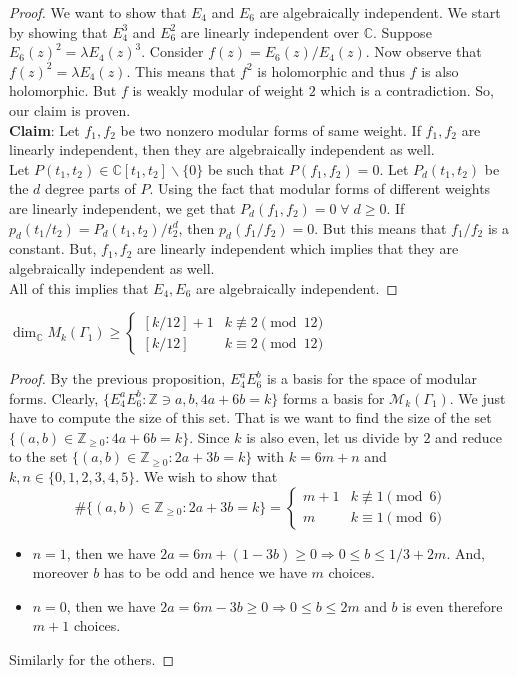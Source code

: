 \documentclass[oneside, 12pt]{scrbook}
\newcommand{\CC}{\mathbb C}
\newcommand{\ZZ}{\mathbb Z}
\newcommand{\Mm}{\mathcal{M}}
\theoremstyle{theorem}
\begin{document}
\begin{proof}
We want to show that $E_{4}$ and $E_{6}$ are algebraically independent. We start by showing that $E_{4}^3$ and $E_{6}^2$ are linearly independent over $\CC$. Suppose $E_{6}(z)^2 = \lambda E_{4}(z)^{3}$. Consider $f(z) = E_{6}(z)/ E_{4}(z)$. Now observe that $f(z)^2 = \lambda E_{4}(z)$. This means that $f^2$ is holomorphic and thus $f$ is also holomorphic. But $f$ is weakly modular of weight $2$ which is a contradiction. So, our claim is proven. \\

\textbf{Claim}: Let $f_{1},f_{2}$ be two nonzero modular forms of same weight. If $f_{1},f_{2}$ are linearly independent, then they are algebraically independent as well. \\

Let $P(t_{1},t_{2}) \in \CC[t_{1},t_{2}] \backslash \{0\}$ be such that $P(f_{1},f_{2})=0$. Let $P_{d}(t_{1},t_{2})$ be the $d$ degree parts of $P$. Using the fact that modular forms of different weights are linearly independent, we get that $P_{d}(f_{1},f_{2})=0 \; \forall \; d \geq 0$. If $p_{d}(t_{1}/t_{2}) = P_{d}(t_{1},t_{2})/t_{2}^d$, then $p_{d}(f_{1}/f_{2})=0$. But this means that $f_{1}/f_{2}$ is a constant. But, $f_{1},f_{2}$ are linearly independent which implies that they are algebraically independent as well. \\

All of this implies that $E_{4},E_{6}$ are algebraically independent.
\end{proof}

\begin{corollary}
$\dim_{\CC} M_{k} (\Gamma_{1}) \geq \begin{cases}[k/12]+1 & k\not \equiv 2\pmod{12} \\ [k/12] & k \equiv 2\pmod{12} \end{cases} $
\end{corollary}

\begin{proof}
By the previous proposition, $E_{4}^aE_{6}^b$ is a basis for the space of modular forms. Clearly, $\{E_{4}^aE_{6}^b: \ZZ \ni a,b , 4a+6b=k\}$ forms a basis for $\Mm_{k}(\Gamma_{1})$. We just have to compute the size of this set. That is we want to find the size of the set $\{(a,b) \in \ZZ_{\geq 0} : 4a + 6b = k\}$. Since $k$ is also even, let us divide by $2$ and reduce to the set $\{(a,b) \in \ZZ_{\geq 0} : 2a + 3b = k\}$ with $k=6m + n$ and $k,n \in \{0,1,2,3,4,5\}$. We wish to show that $$\#\{(a,b) \in \ZZ_{\geq 0} : 2a + 3b = k\} = \begin{cases}m+1 & k\not \equiv 1\pmod{6} \\ m & k \equiv 1\pmod{6} \end{cases}$$
\begin{itemize}
\item $n=1$, then we have $2a = 6m + (1-3b) \geq 0 \Rightarrow 0 \le b \le 1/3 + 2m$. And, moreover $b$ has to be odd and hence we have $m$ choices.
\item $n=0$, then we have $2a = 6m -3b \geq 0 \Rightarrow 0 \le b \le 2m $ and $b$ is even therefore $m+1$ choices.
\end{itemize}
Similarly for the others.
\end{proof}
\end{document}
